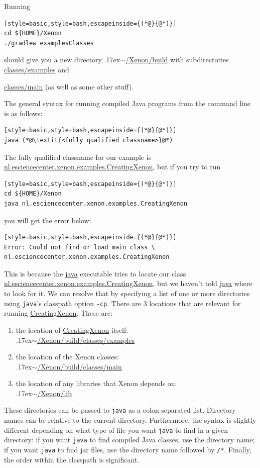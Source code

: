 \documentclass[12pt, a4paper, twoside,openany,titlepage]{article}
\newcommand{\mytilde}{\raise.17ex\hbox{$\scriptstyle\sim$}}
\begin{document}
Running
\begin{lstlisting}[style=basic,style=bash,escapeinside={(*@}{@*)}]
cd ${HOME}/Xenon
./gradlew examplesClasses
\end{lstlisting} %
should give you a new directory \mytilde\url{/Xenon/build} with subdirectories \url{classes/examples} and {\url{classes/main} (as well as some other stuff).


The general syntax for running compiled Java programs from the command line is as follows:
\begin{lstlisting}[style=basic,style=bash,escapeinside={(*@}{@*)}]
java (*@\textit{<fully qualified classname>}@*)
\end{lstlisting}
The fully qualified classname for our example is \url{nl.esciencecenter.xenon.examples.CreatingXenon}, but if you try to run
\begin{lstlisting}[style=basic,style=bash,escapeinside={(*@}{@*)}]
cd ${HOME}/Xenon
java nl.esciencecenter.xenon.examples.CreatingXenon
\end{lstlisting} %
you will get the error below:
\begin{lstlisting}[style=basic,style=bash,escapeinside={(*@}{@*)}]
Error: Could not find or load main class \
nl.esciencecenter.xenon.examples.CreatingXenon
\end{lstlisting}

This is because the \url{java} executable tries to locate our class \url{nl.esciencecenter.xenon.examples.CreatingXenon}, but we haven't told \url{java} where to look for it. We can resolve that by specifying a list of one or more directories using \texttt{java}'s classpath option \texttt{-cp}. There are 3 locations that are relevant for running \url{CreatingXenon}. These are:
\begin{enumerate}
\item{the location of \url{CreatingXenon} itself:\\ \mytilde\url{/Xenon/build/classes/examples}}
\item{the location of the Xenon classes:\\ \mytilde\url{/Xenon/build/classes/main}}
\item{the location of any libraries that Xenon depends on:\\ \mytilde\url{/Xenon/lib}}
\end{enumerate}
These directories can be passed to \texttt{java} as a colon-separated list. Directory names can be relative to the current directory. Furthermore, the syntax is slightly different depending on what type of file you want \texttt{java} to find in a given directory: if you want \texttt{java} to find compiled Java classes, use the directory name; if you want \texttt{java} to find jar files, use the directory name followed by \texttt{/*}. Finally, the order within the classpath is significant.

}
\end{document}
